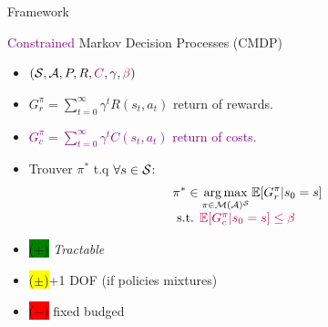 \documentclass{beamer}
\newcommand{\cplus}{\colorbox{green}{($+$)} }
\newcommand{\cmoins}{\colorbox{red}{($-$)} }
\newcommand{\cmean}{\colorbox{yellow}{($\pm$)}}
\begin{document}
    \begin{frame}{Framework}

        \begin{block}{\textcolor{purple}{Constrained} Markov Decision Processes (CMDP)}
            \begin{itemize}
                \item $(\mathcal{S}, \mathcal{A}, P, R,\textcolor{purple}{C}, \gamma,\textcolor{purple}{\beta})$
                \item $G_r^\pi = \sum_{t=0}^\infty \gamma^t R(s_t, a_t)$ return of rewards.
                \item \textcolor{purple}{ $G_c^\pi = \sum_{t=0}^\infty \gamma^t C(s_t, a_t)$ return of costs.}
                \item Trouver $\pi^*$ t.q $\forall s\in\mathcal{S}$:
                \begin{equation}
                    \label{eq:cmdp}
                    \begin{array}{lcr}
                        \displaystyle \pi^* \in \operatorname*{arg\,max}_{\pi\in\mathcal{M}(\mathcal{A})^{\mathcal{S}}} \operatorname*{\mathbb{E}}[G_r^\pi | s_0=s] \\
                        \text{ s.t. }  \textcolor{purple}{\operatorname*{\mathbb{E}}[G_c^\pi | s_0=s] \leq \beta}
                    \end{array}
                \end{equation}
            \end{itemize}
        \end{block}

        \begin{block}{}
            \begin{itemize}
                \item \cplus \textit{Tractable}
                \item \cmean +1 DOF (if policies mixtures) %
                \item \cmoins fixed budged


            \end{itemize}
        \end{block}

    \end{frame}
\end{document}
